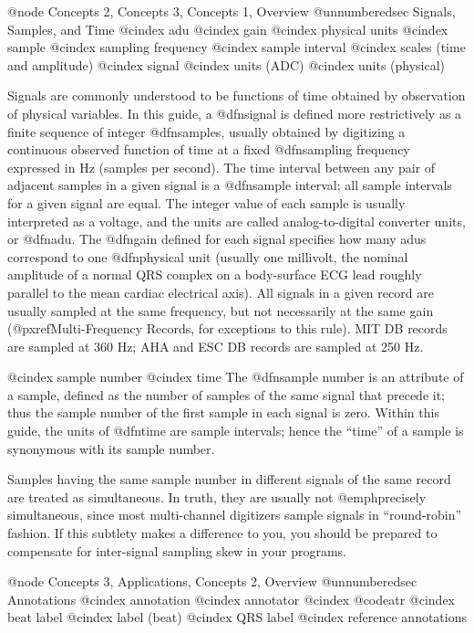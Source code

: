 @node     Concepts 2, Concepts 3, Concepts 1, Overview
@unnumberedsec Signals, Samples, and Time
@cindex adu
@cindex gain
@cindex physical units
@cindex sample
@cindex sampling frequency
@cindex sample interval
@cindex scales (time and amplitude)
@cindex signal
@cindex units (ADC)
@cindex units (physical)

Signals are commonly understood to be functions of time obtained by
observation of physical variables.  In this guide, a @dfn{signal} is
defined more restrictively as a finite sequence of integer
@dfn{samples}, usually obtained by digitizing a continuous observed
function of time at a fixed @dfn{sampling frequency} expressed in Hz
(samples per second).  The time interval between any pair of adjacent
samples in a given signal is a @dfn{sample interval}; all sample
intervals for a given signal are equal.  The integer value of each
sample is usually interpreted as a voltage, and the units are called
analog-to-digital converter units, or @dfn{adu}.  The @dfn{gain} defined
for each signal specifies how many adus correspond to one @dfn{physical
unit} (usually one millivolt, the nominal amplitude of a normal QRS
complex on a body-surface ECG lead roughly parallel to the mean cardiac
electrical axis).  All signals in a given record are usually sampled at
the same frequency, but not necessarily at the same gain
(@pxref{Multi-Frequency Records}, for exceptions to
this rule).  MIT DB records are sampled at 360 Hz; AHA and ESC DB
records are sampled at 250 Hz.

@cindex sample number
@cindex time
The @dfn{sample number} is an attribute of a sample, defined as the
number of samples of the same signal that precede it;  thus the sample
number of the first sample in each signal is zero.  Within this guide,
the units of @dfn{time} are sample intervals;  hence the ``time'' of a
sample is synonymous with its sample number.

Samples having the same sample number in different signals of the same
record are treated as simultaneous.  In truth, they are usually not
@emph{precisely} simultaneous, since most multi-channel digitizers
sample signals in ``round-robin'' fashion.  If this subtlety makes a
difference to you, you should be prepared to compensate for inter-signal
sampling skew in your programs.

@node     Concepts 3, Applications, Concepts 2, Overview
@unnumberedsec Annotations
@cindex annotation
@cindex annotator
@cindex @code{atr}
@cindex beat label
@cindex label (beat)
@cindex QRS label
@cindex reference annotations


